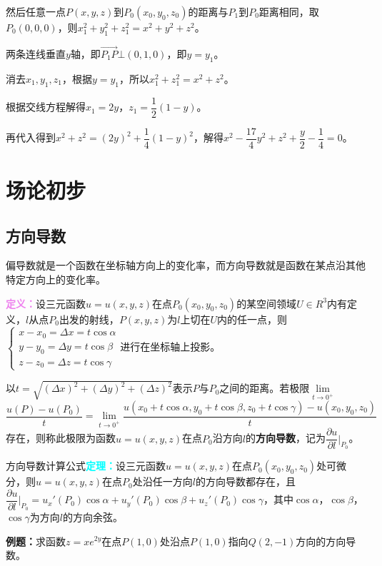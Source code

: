 然后任意一点$P(x,y,z)$到$P_0(x_0,y_0,z_0)$的距离与$P_1$到$P_0$距离相同，取$P_0(0,0,0)$，则$x_1^2+y_1^2+z_1^2=x^2+y^2+z^2$。

两条连线垂直$y$轴，即$\overrightarrow{P_1P}\bot(0,1,0)$，即$y=y_1$。

消去$x_1,y_1,z_1$，根据$y=y_1$，所以$x_1^2+z_1^2=x^2+z^2$。

根据交线方程解得$x_1=2y$，$z_1=\dfrac{1}{2}(1-y)$。

再代入得到$x^2+z^2=(2y)^2+\dfrac{1}{4}(1-y)^2$，解得$x^2-\dfrac{17}{4}y^2+z^2+\dfrac{y}{2}-\dfrac{1}{4}=0$。

\section{场论初步}

\subsection{方向导数}

偏导数就是一个函数在坐标轴方向上的变化率，而方向导数就是函数在某点沿其他特定方向上的变化率。

\textcolor{violet}{\textbf{定义：}}设三元函数$u=u(x,y,z)$在点$P_0(x_0,y_0,z_0)$的某空间领域$U\in R^3$内有定义，$l$从点$P_0$出发的射线，$P(x,y,z)$为$l$上切在$U$内的任一点，则$\left\{\begin{array}{l}
    x-x_0=\Delta x=t\cos\alpha \\
    y-y_0=\Delta y=t\cos\beta \\
    z-z_0=\Delta z=t\cos\gamma
\end{array}\right.$进行在坐标轴上投影。

以$t=\sqrt{(\Delta x)^2+(\Delta y)^2+(\Delta z)^2}$表示$P$与$P_0$之间的距离。若极限$\lim\limits_{t\to0^+}$\\$\dfrac{u(P)-u(P_0)}{t}=\lim\limits_{t\to0^+}\dfrac{u(x_0+t\cos\alpha,y_0+t\cos\beta,z_0+t\cos\gamma)-u(x_0,y_0,z_0)}{t}$存在，则称此极限为函数$u=u(x,y,z)$在点$P_0$沿方向$l$的\textbf{方向导数}，记为$\dfrac{\partial u}{\partial l}\bigg|_{P_0}$。

方向导数计算公式\textcolor{aqua}{\textbf{定理：}}设三元函数$u=u(x,y,z)$在点$P_0(x_0,y_0,z_0)$处可微分，则$u=u(x,y,z)$在点$P_0$处沿任一方向$l$的方向导数都存在，且$\dfrac{\partial u}{\partial l}\bigg|_{P_0}=u_x'(P_0)\cos\alpha+u_y'(P_0)\cos\beta+u_z'(P_0)\cos\gamma$，其中$\cos\alpha$，$\cos\beta$，$\cos\gamma$为方向$l$的方向余弦。

\textbf{例题：}求函数$z=xe^{2y}$在点$P(1,0)$处沿点$P(1,0)$指向$Q(2,-1)$方向的方向导数。

